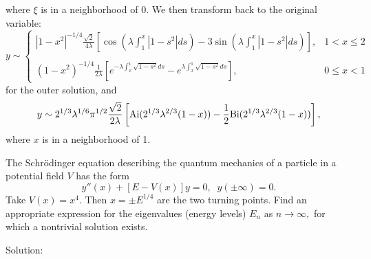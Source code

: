 where $\xi$ is in a neighborhood of $0$. We then transform back to the original variable:
$$y\sim\left\{\begin{array}{cc}|1-x^2|^{-1/4}\frac{\sqrt{2}}{4\lambda}\left[\cos\left(\lambda\int_1^x|1-s^2|ds\right)-3\sin\left(\lambda\int_1^x|1-s^2|ds\right)\right],&1<x\leq2\\ \\
(1-x^2)^{-1/4}\frac{1}{2\lambda}\left[e^{-\lambda\int_x^1\sqrt{1-s^2}ds}-e^{\lambda\int_x^1\sqrt{1-s^2}ds}\right],&0\leq x<1\end{array}\right.$$
for the outer solution, and
$$y\sim2^{1/3}\lambda^{1/6}\pi^{1/2}\frac{\sqrt{2}}{2\lambda}\left[{\rm Ai}(2^{1/3}\lambda^{2/3}(1-x))-\frac{1}{2}{\rm Bi}(2^{1/3}\lambda^{2/3}(1-x))\right],$$
where $x$ is in a neighborhood of 1.


\item The Schr\" odinger equation describing the quantum mechanics of a particle in a potential field $V$ has the form
\begin{equation*}
y''(x) + [E-V(x)]y = 0, \;\; y(\pm \infty) = 0.
\end{equation*}
Take $V(x) = x^4.$  Then $x = \pm E^{1/4}$ are the two turning points.  Find an appropriate expression for the eigenvalues (energy levels) $E_n$ as $n \to \infty,$ for which a nontrivial solution exists.


Solution:\\

